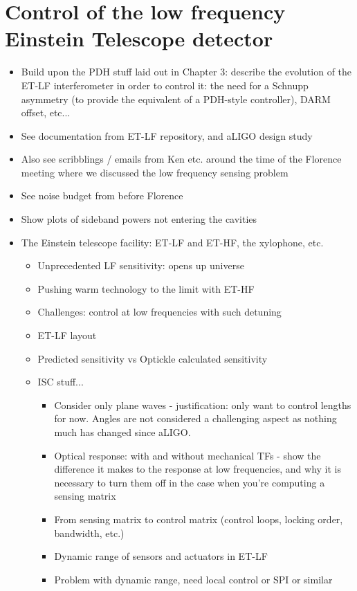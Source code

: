 \chapter{Control of the low frequency Einstein Telescope detector}
\label{c:et-lf-control}

\begin{itemize}
  \item Build upon the PDH stuff laid out in Chapter 3: describe the evolution of the ET-LF interferometer in order to control it: the need for a Schnupp asymmetry (to provide the equivalent of a PDH-style controller), DARM offset, etc...
  
  \item See documentation from ET-LF repository, and aLIGO design study
  
  \item Also see scribblings / emails from Ken etc. around the time of the Florence meeting where we discussed the low frequency sensing problem
  
  \item See noise budget from before Florence
  
  \item Show plots of sideband powers not entering the cavities

  \item The Einstein telescope facility: ET-LF and ET-HF, the xylophone, etc.
    \begin{itemize}
      \item Unprecedented LF sensitivity: opens up universe
      \item Pushing warm technology to the limit with ET-HF
      \item Challenges: control at low frequencies with such detuning
      \item ET-LF layout
      \item Predicted sensitivity vs Optickle calculated sensitivity
      \item ISC stuff...
	\begin{itemize}
	  \item Consider only plane waves - justification: only want to control lengths for now. Angles are not considered a challenging aspect as nothing much has changed since aLIGO.
	  \item Optical response: with and without mechanical TFs - show the difference it makes to the response at low frequencies, and why it is necessary to turn them off in the case when you're computing a sensing matrix
	  \item From sensing matrix to control matrix (control loops, locking order, bandwidth, etc.)
	  \item Dynamic range of sensors and actuators in ET-LF
	  \item Problem with dynamic range, need local control or SPI or similar
	\end{itemize}
      \end{itemize}
\end{itemize}
  
